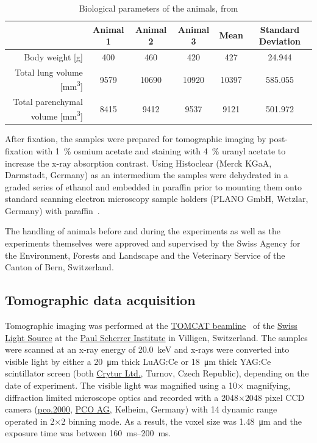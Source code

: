 \documentclass[a4paper,DIV=calc,abstract,english]{scrartcl}
\newcommand{\bodyweightB}{400} %
\newcommand{\bodyweightD}{460} %
\newcommand{\bodyweightE}{420} %
\newcommand{\meanbodyweight}{427} %
\newcommand{\meanbodyweightSTD}{24.944}
\newcommand{\totallungvolumeB}{9579} %
\newcommand{\totallungvolumeD}{10690} %
\newcommand{\totallungvolumeE}{10920} %
\newcommand{\meantotallungvolume}{10397} %
\newcommand{\meantotallungvolumeSTD}{585.055}
\newcommand{\parenchymalvolumeB}{8415} %
\newcommand{\parenchymalvolumeD}{9412} %
\newcommand{\parenchymalvolumeE}{9537} %
\newcommand{\meanparenchymalvolume}{9121} %
\newcommand{\meanparenchymalvolumeSTD}{501.972}
\begin{document}
\begin{table}
	\centering
	\caption{Biological parameters of the animals, from \cite{Tschanz2003}}
	\begin{tabular}{rccccc}
	\toprule
																	& Animal 1 & Animal 2 & Animal 3 & Mean & Standard Deviation \\
	\midrule
	Body weight [g]												& \bodyweightB & \bodyweightD & \bodyweightE & \meanbodyweight & \meanbodyweightSTD \\
	Total lung volume [\si{\milli\meter\cubed}]			& \totallungvolumeB & \totallungvolumeD & \totallungvolumeE & \meantotallungvolume & \meantotallungvolumeSTD \\
	Total parenchymal volume [\si{\milli\meter\cubed}]	& \parenchymalvolumeB & \parenchymalvolumeD & \parenchymalvolumeE & \meanparenchymalvolume & \meanparenchymalvolumeSTD \\
	\bottomrule
	\end{tabular}
	\label{tab:animals}
\end{table}

After fixation, the samples were prepared for tomographic imaging by post-fixation with \SI{1}{\percent} osmium acetate and staining with \SI{4}{\percent} uranyl acetate to increase the x-ray absorption contrast.
Using Histoclear (Merck KGaA, Darmstadt, Germany) as an intermedium the samples were dehydrated in a graded series of ethanol and embedded in paraffin prior to mounting them onto standard scanning electron microscopy sample holders (PLANO GmbH, Wetzlar, Germany) with paraffin~\cite{Tsuda2008}.

The handling of animals before and during the experiments as well as the experiments themselves were approved and supervised by the Swiss Agency for the Environment, Forests and Landscape and the Veterinary Service of the Canton of Bern, Switzerland.

\subsection{Tomographic data acquisition}
Tomographic imaging was performed at the \href{http://www.psi.ch/sls/tomcat/}{TOMCAT beamline}~\cite{Stampanoni2006a} of the \href{http://www.psi.ch/sls/}{Swiss Light Source} at the \href{http://www.psi.ch/}{Paul Scherrer Institute} in Villigen, Switzerland.
The samples were scanned at an x-ray energy of \SI{20.0}{\kilo\electronvolt} and x-rays were converted into visible light by either a \SI{20}{\micro\meter} thick LuAG:Ce or \SI{18}{\micro\meter} thick YAG:Ce scintillator screen (both \href{http://www.crytur.cz/}{Crytur Ltd.}, Turnov, Czech Republic), depending on the date of experiment.
The visible light was magnified using a 10\(\times\) magnifying, diffraction limited microscope optics and recorded with a 2048\(\times\)2048 pixel CCD camera (\href{http://www.pco.de/sensitive-cameras/pco2000/}{pco.2000}, \href{http://www.pco.de/}{PCO AG}, Kelheim, Germany) with \SI{14}{\bit} dynamic range operated in 2\(\times\)2 binning mode.
As a result, the voxel size was \SI{1.48}{\micro\meter} and the exposure time was between \SIrange{160}{200}{\milli\second}.
\end{document}

